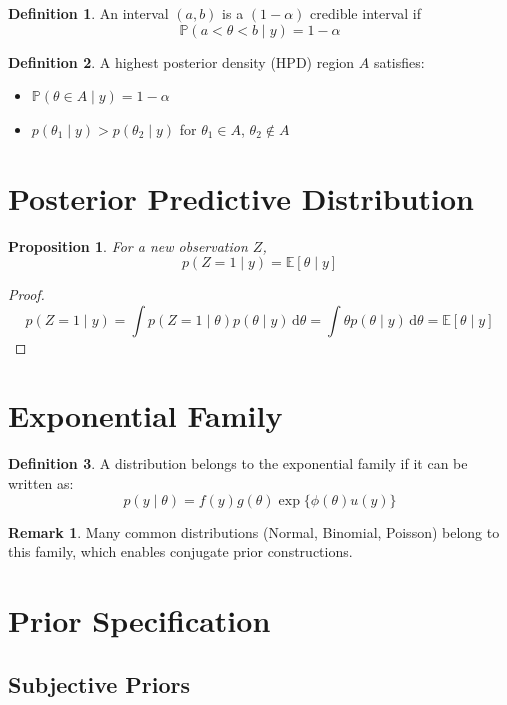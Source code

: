 \documentclass[12pt,oneside]{book}
\numberwithin{equation}{section}
\theoremstyle{definition}
\newtheorem{definition}{Definition}[section]
\newtheorem{remark}{Remark}[section]
\theoremstyle{plain}
\newtheorem{proposition}{Proposition}[section]
\theoremstyle{remark}
\newcommand{\E}{\mathbb{E}}
\newcommand{\Prob}{\mathbb{P}}
\newcommand{\dd}{\,\mathrm{d}}
\begin{document}
\begin{definition}
An interval $(a,b)$ is a $(1-\alpha)$ credible interval if
$$
\Prob(a < \theta < b \mid y) = 1 - \alpha
$$
\end{definition}

\begin{definition}
A highest posterior density (HPD) region $A$ satisfies:
\begin{itemize}
    \item $\Prob(\theta \in A \mid y) = 1-\alpha$
    \item $p(\theta_1 \mid y) > p(\theta_2 \mid y)$ for $\theta_1 \in A$, $\theta_2 \notin A$
\end{itemize}
\end{definition}

\section{Posterior Predictive Distribution}

\begin{proposition}
For a new observation $Z$,
$$
p(Z=1 \mid y) = \E[\theta \mid y]
$$
\end{proposition}

\begin{proof}
$$
p(Z=1 \mid y) = \int p(Z=1 \mid \theta)p(\theta \mid y)\dd \theta
= \int \theta p(\theta \mid y)\dd \theta = \E[\theta \mid y]
$$
\end{proof}

\section{Exponential Family}

\begin{definition}
A distribution belongs to the exponential family if it can be written as:
$$
p(y \mid \theta) = f(y)g(\theta)\exp\{\phi(\theta)u(y)\}
$$
\end{definition}

\begin{remark}
Many common distributions (Normal, Binomial, Poisson) belong to this family, which enables conjugate prior constructions.
\end{remark}

\section{Prior Specification}

\subsection{Subjective Priors}
\end{document}
